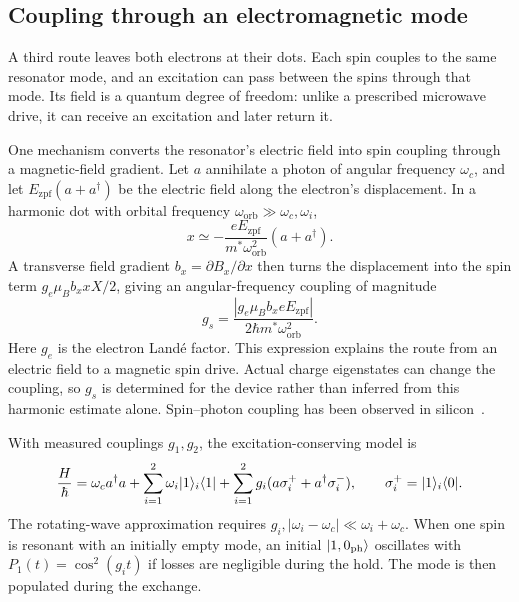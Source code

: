 \subsection{Coupling through an electromagnetic mode}
\label{sec:processor-mode-coupling}

A third route leaves both electrons at their dots. Each spin
couples to the same resonator mode, and an excitation can pass
between the spins through that mode. Its field is a quantum
degree of freedom: unlike a prescribed microwave drive, it can
receive an excitation and later return it.

One mechanism converts the resonator's electric field into
spin coupling through a magnetic-field gradient. Let \(a\)
annihilate a photon of angular frequency \(\omega_c\), and let
\(E_{\mathrm{zpf}}(a+a^\dagger)\) be the electric field along the
electron's displacement. In a harmonic dot with orbital
frequency \(\omega_{\mathrm{orb}}\gg\omega_c,\omega_i\),
\[
 x\simeq-\frac{eE_{\mathrm{zpf}}}
                  {m^*\omega_{\mathrm{orb}}^2}(a+a^\dagger).
\]
A transverse field gradient \(b_x=\partial B_x/\partial x\)
then turns the displacement into the spin term
\(g_e\mu_B b_x xX/2\), giving an angular-frequency coupling
of magnitude
\[
 g_s=\frac{|g_e\mu_B b_x eE_{\mathrm{zpf}}|}
                {2\hbar m^*\omega_{\mathrm{orb}}^2}.
\]
Here \(g_e\) is the electron Land\'e factor. This expression
explains the route from an electric field to a magnetic spin
drive. Actual charge eigenstates can change the coupling, so
\(g_s\) is determined for the device rather than inferred from
this harmonic estimate alone. Spin--photon coupling has been
observed in silicon~\cite{Samkharadze2018}.

With measured couplings \(g_1,g_2\), the
excitation-conserving model is
\begin{equation}
 \frac H\hbar=\omega_c a^\dagger a+
   \sum_{i=1}^2\omega_i\ket1_i\bra1+
   \sum_{i=1}^2g_i(a\sigma_i^++a^\dagger\sigma_i^-),
 \qquad \sigma_i^+=\ket1_i\bra0.
 \label{eq:processor-spin-mode-model}
\end{equation}
The rotating-wave approximation requires
\(g_i,|\omega_i-\omega_c|\ll\omega_i+\omega_c\).
When one spin is resonant with an initially empty mode, an
initial \(\lvert 1,0_{\mathrm{ph}}\rangle\) oscillates with
\(P_1(t)=\cos^2(g_i t)\) if losses are negligible during the
hold. The mode is then populated during the exchange.

